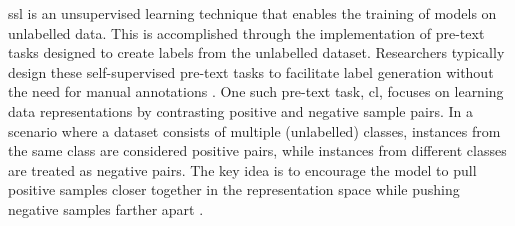 \acf{ssl} is an unsupervised learning technique that enables the training of models on unlabelled data.
This is accomplished through the implementation of pre-text tasks 
designed to create labels from the unlabelled dataset.
Researchers typically design these self-supervised pre-text tasks 
to facilitate label generation without the need for manual annotations \citep{PIC_2020}.
One such pre-text task, \acf{cl}, 
focuses on learning data representations by contrasting positive and negative sample pairs. 
In a scenario where a dataset consists of multiple (unlabelled) classes, 
instances from the same class are considered positive pairs, 
while instances from different classes are treated as negative pairs.
The key idea is to encourage the model to pull positive samples closer together 
in the representation space 
while pushing negative samples farther apart \citep{mining_potential_2024}.
